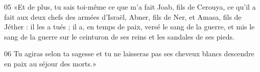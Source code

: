 
05 «Et de plus, tu sais toi-même ce que m’a fait Joab, fils de Cerouya, ce qu’il a fait aux deux chefs des armées d’Israël, Abner, fils de Ner, et Amasa, fils de Jéther : il les a tués ; il a, en temps de paix, versé le sang de la guerre, et mis le sang de la guerre sur le ceinturon de ses reins et les sandales de ses pieds.

06 Tu agiras selon ta sagesse et tu ne laisseras pas ses cheveux blancs descendre en paix au séjour des morts.»
